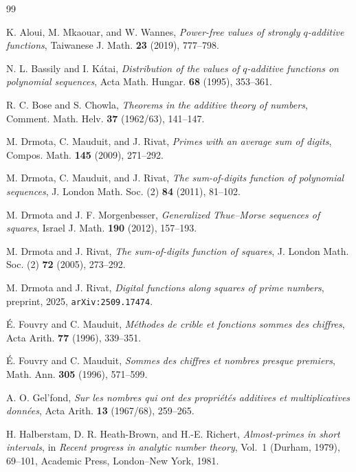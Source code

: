 \documentclass[11pt,reqno]{amsart}
\theoremstyle{plain}
\theoremstyle{definition}
\newcommand{\1}{\mathbf 1}
\begin{document}
\begin{thebibliography}{99}

 K. Aloui, M. Mkaouar, and W. Wannes, \emph{Power-free values of strongly $q$-additive functions}, Taiwanese J. Math. \textbf{23} (2019), 777--798.

 N. L. Bassily and I. K\'atai, \emph{Distribution of the values of $q$-additive functions on polynomial sequences}, Acta Math. Hungar. \textbf{68} (1995), 353--361.

 R. C. Bose and S. Chowla, \emph{Theorems in the additive theory of numbers}, Comment. Math. Helv. \textbf{37} (1962/63), 141--147.

 M. Drmota, C. Mauduit, and J. Rivat, \emph{Primes with an average sum of digits}, Compos. Math. \textbf{145} (2009), 271--292.

 M. Drmota, C. Mauduit, and J. Rivat, \emph{The sum-of-digits function of polynomial sequences}, J. London Math. Soc. (2) \textbf{84} (2011), 81--102.

 M. Drmota and J. F. Morgenbesser, \emph{Generalized Thue--Morse sequences of squares}, Israel J. Math. \textbf{190} (2012), 157--193.

 M. Drmota and J. Rivat, \emph{The sum-of-digits function of squares}, J. London Math. Soc. (2) \textbf{72} (2005), 273--292.

 M. Drmota and J. Rivat, \emph{Digital functions along squares of prime numbers}, preprint, 2025, \texttt{arXiv:2509.17474}.

 \'E. Fouvry and C. Mauduit, \emph{M\'ethodes de crible et fonctions sommes des chiffres}, Acta Arith. \textbf{77} (1996), 339--351.

 \'E. Fouvry and C. Mauduit, \emph{Sommes des chiffres et nombres presque premiers}, Math. Ann. \textbf{305} (1996), 571--599.

 A. O. Gel'fond, \emph{Sur les nombres qui ont des propri\'et\'es additives et multiplicatives donn\'ees}, Acta Arith. \textbf{13} (1967/68), 259--265.

 H. Halberstam, D. R. Heath-Brown, and H.-E. Richert, \emph{Almost-primes in short intervals}, in \emph{Recent progress in analytic number theory}, Vol.~1 (Durham, 1979), 69--101, Academic Press, London--New York, 1981.


\end{thebibliography}
\end{document}
